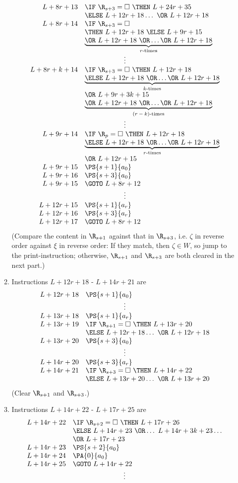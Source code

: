\begin{enumerate}[1.]
\begin{enumerate}[(1)]
\[\begin{array}{rl}
L + 8r + 13 & \IF \ \R_{s + 3} = \Box \ \THEN \ L + 24r + 35 \cr
\ & \ELSE \ L + 12r + 18 \ldots \ \OR \ L + 12r + 18 \cr
L + 8r + 14 & \IF \ \R_{s + 3} = \Box \cr
\ & \THEN \ L + 12r + 18 \ \ELSE \ L + 9r + 15 \cr
\ & \underbrace{\OR \ L + 12r + 18 \ \OR \ldots \OR \ L + 12r + 18}_{\mbox{\scriptsize$r$-times}} \cr
\multicolumn{2}{c}{\vdots} \cr
L + 8r + k + 14 & \IF \ \R_{s + 3} = \Box \ \THEN \ L + 12r + 18 \cr
\ & \underbrace{\ELSE \ L + 12r + 18 \ \OR \ldots \OR \ L + 12r + 18}_{\mbox{\scriptsize$k$-times}} \cr
\ & \OR \ L + 9r + 3k + 15 \cr
\ & \underbrace{\OR \ L + 12r + 18 \ \OR \ldots \OR \ L + 12r + 18}_{\mbox{\scriptsize $(r - k)$-times}} \cr
\multicolumn{2}{c}{\vdots} \cr
L + 9r + 14 & \IF \ \R_p = \Box \ \THEN \ L + 12r + 18 \cr
\ & \underbrace{\ELSE \ L + 12r + 18 \ \OR \ldots \OR \ L + 12r + 18}_{\mbox{\scriptsize$r$-times}} \cr
\ & \OR \ L + 12r + 15 \cr
L + 9r + 15 & \PS{s + 1}{a_0} \cr
L + 9r + 16 & \PS{s + 3}{a_0} \cr
L + 9r + 15 & \GOTO \ L + 8r + 12 \cr
\multicolumn{2}{c}{\vdots} \cr
L + 12r + 15 & \PS{s + 1}{a_r} \cr
L + 12r + 16 & \PS{s + 3}{a_r} \cr
L + 12r + 17 & \GOTO \ L + 8r + 12
\end{array}
\]
(Compare the content in $\R_{s + 1}$ against that in $\R_{s + 3}$, i.e. $\zeta$ in reverse order against $\xi$ in reverse order: If they match, then $\zeta \in W$, so jump to the print-instruction; otherwise, $\R_{s + 1}$ and $\R_{s + 3}$ are both cleared in the next part.)
\item Instructions $L + 12r + 18$ - $L + 14r + 21$ are
\[
\begin{array}{rl}
L + 12r + 18 & \PS{s + 1}{a_0} \cr
\multicolumn{2}{c}{\vdots} \cr
L + 13r + 18 & \PS{s + 1}{a_r} \cr
L + 13r + 19 & \IF \ \R_{s + 1} = \Box \ \THEN \ L + 13r + 20 \cr
\ & \ELSE \ L + 12r + 18 \ldots \ \OR \ L + 12r + 18 \cr
L + 13r + 20 & \PS{s + 3}{a_0} \cr
\multicolumn{2}{c}{\vdots} \cr
L + 14r + 20 & \PS{s + 3}{a_r} \cr
L + 14r + 21 & \IF \ \R_{s + 3} = \Box \ \THEN \ L + 14r + 22 \cr
\ & \ELSE \ L + 13r + 20 \ldots \ \OR \ L + 13r + 20 \cr
\end{array}
\]
(Clear $\R_{s + 1}$ and $\R_{s + 3}$.)
\item Instructions $L + 14r + 22$ - $L + 17r + 25$ are
\[
\begin{array}{rl}
L + 14r + 22 & \IF \ \R_{s + 2} = \Box \ \THEN \ L + 17r + 26 \cr
\ & \ELSE \ L + 14r + 23 \ \OR \ldots \ L + 14r + 3k + 23 \ldots \cr
\ & \OR \ L + 17r + 23 \cr
L + 14r + 23 & \PS{s + 2}{a_0} \cr
L + 14r + 24 & \PA{0}{a_0} \cr
L + 14r + 25 & \GOTO \ L + 14r + 22 \cr
\multicolumn{2}{c}{\vdots} \cr

\end{array}\]
\end{enumerate}
\end{enumerate}
